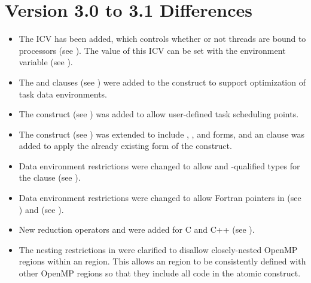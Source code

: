 \section{Version 3.0 to 3.1 Differences}
\label{sec:Version 3.0 to 3.1 Differences}
\begin{itemize}
\item The  ICV has been added, which controls whether or not threads are bound
to processors (see
).
The value of this ICV can be set with
the  environment variable (see
).

\item The  and  clauses (see
) were added to
the  construct to support optimization of task data environments.

\item The  construct (see
) was added to allow
user-defined task scheduling points.

\item The  construct (see
) was extended to include
, , and  forms, and an  clause was added to apply
the already existing form of the  construct.

\item Data environment restrictions were changed to allow  and
-qualified types for the  clause (see
).

\item Data environment restrictions were changed to allow Fortran pointers in
 (see
)
and  (see
).

\item New reduction operators  and  were added for C and C++ (see ).

\item The nesting restrictions in
 were clarified to disallow
closely-nested OpenMP regions within an  region. This allows an 
region to be consistently defined with other OpenMP regions so that they include all
code in the atomic construct.


\end{itemize}
